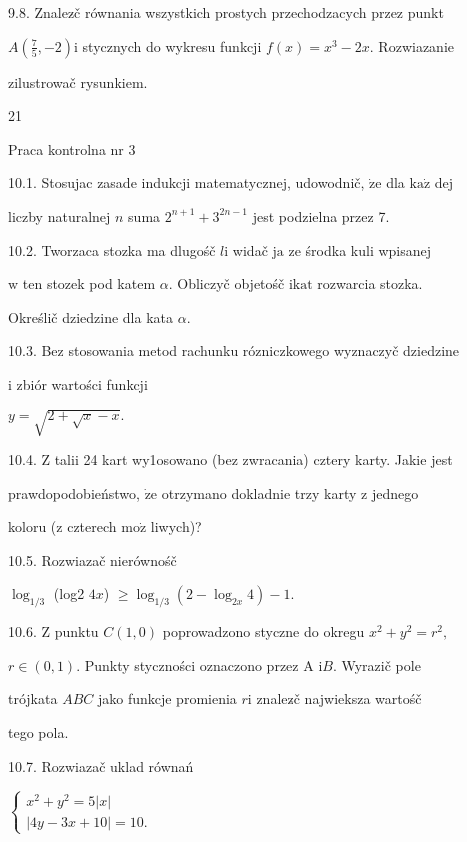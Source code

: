 \documentclass[a4paper,12pt]{article}
\begin{document}
9.8. Znalez$\acute{}$č równania wszystkich prostych przechodzacych przez punkt

$A(\displaystyle \frac{7}{5},-2)\mathrm{i}$ stycznych do wykresu funkcji $f(x)=x^{3}-2x$. Rozwiazanie

zilustrowač rysunkiem.





21

Praca kontrolna nr 3

10.1. Stosujac zasade indukcji matematycznej, udowodnič, $\dot{\mathrm{z}}\mathrm{e}$ dla $\mathrm{k}\mathrm{a}\dot{\mathrm{z}}$ dej

liczby naturalnej $n$ suma $2^{n+1}+3^{2n-1}$ jest podzielna przez 7.

10.2. Tworzaca stozka ma dlugośč $l \mathrm{i}$ widač $\mathrm{j}\mathrm{a}$ ze środka kuli wpisanej

$\mathrm{w}$ ten stozek pod katem $\alpha$. Obliczyč objetośč $\mathrm{i}\mathrm{k}\mathrm{a}\mathrm{t}$ rozwarcia stozka.

Określič dziedzine dla kata $\alpha.$

10.3. Bez stosowania metod rachunku rózniczkowego wyznaczyč dziedzine

$\mathrm{i}$ zbiór wartości funkcji

$y=\sqrt{2+\sqrt{x}-x}.$

10.4. $\mathrm{Z}$ talii 24 kart wy1osowano (bez zwracania) cztery karty. Jakie jest

prawdopodobieństwo, $\dot{\mathrm{z}}\mathrm{e}$ otrzymano dokladnie trzy karty $\mathrm{z}$ jednego

koloru ($\mathrm{z}$ czterech $\mathrm{m}\mathrm{o}\dot{\mathrm{z}}$ liwych)?

10.5. Rozwiazač nierównośč

$\log_{1/3}$ (log2 $4x$) $\geq\log_{1/3}(2-\log_{2x}4)-1.$

10.6. $\mathrm{Z}$ punktu $C(1,0)$ poprowadzono styczne do okregu $x^{2}+y^{2} = r^{2},$

$ r\in (0,1)$. Punkty styczności oznaczono przez A $\mathrm{i}B$. Wyrazič pole

trójkata $ABC$ jako funkcje promienia $r\mathrm{i}$ znalez$\acute{}$č najwieksza wartośč

tego pola.

10.7. Rozwiazač uklad równań

$\left\{\begin{array}{l}
x^{2}+y^{2}=5|x|\\
|4y-3x+10|=10.
\end{array}\right.$
\end{document}
